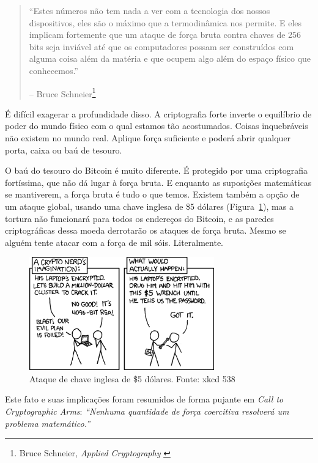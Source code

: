 \begin{quotation}\begin{samepage}
\enquote{Estes números não tem nada a ver com a tecnologia dos nossos dispositivos, eles são o máximo que a termodinâmica nos permite. E eles implicam fortemente que um ataque de força bruta contra chaves de 256 bits seja inviável até que os computadores possam ser construídos com alguma coisa além da matéria e que ocupem algo além do espaço físico que conhecemos.}
\begin{flushright} -- Bruce Schneier\footnote{Bruce Schneier, \textit{Applied Cryptography} \cite{bruce-schneier}}
\end{flushright}\end{samepage}\end{quotation}

É difícil exagerar a profundidade disso. A criptografia forte inverte o equilíbrio de poder do mundo físico com o qual estamos tão acostumados. Coisas inquebráveis não existem no mundo real. Aplique força suficiente e poderá abrir qualquer porta, caixa ou baú de tesouro.

O baú do tesouro do Bitcoin é muito diferente. É protegido por uma criptografia fortíssima, que não dá lugar à força bruta. E enquanto as suposições matemáticas se mantiverem, a força bruta é tudo o que temos. Existem também a opção de um ataque global, usando uma chave inglesa de \$5 dólares (Figura~\ref{fig:xkcd-538}), mas a tortura não funcionará para todos os endereços do Bitcoin, e as paredes criptográficas dessa moeda derrotarão os ataques de força bruta. Mesmo se alguém tente atacar com a força de mil sóis. Literalmente.

\begin{figure}
  \centering
  \includegraphics[width=8cm]{assets/images/xkcd-538.png}
  \caption{Ataque de chave inglesa de \$5 dólares. Fonte: xkcd 538}
  \label{fig:xkcd-538}
\end{figure}

Este fato e suas implicações foram resumidos de forma pujante em \textit{Call to Cryptographic Arms}: \textit{\enquote{Nenhuma quantidade de força coercitiva resolverá um problema matemático.}}


